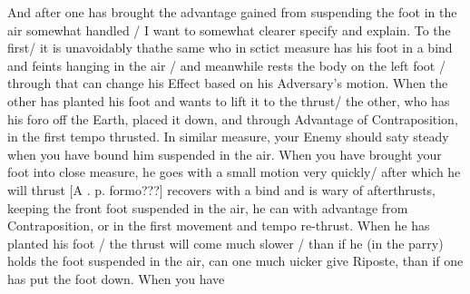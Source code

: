 And after one has brought the advantage gained from suspending the
foot in the air somewhat handled / I want to somewhat clearer specify
and explain. To the first/ it is unavoidably thathe same who in sctict
measure has his foot in a bind and feints hanging in the air / and
meanwhile rests the body on the left foot / through that can change
his Effect based on his Adversary's motion.
When the other has planted his foot and wants to lift it to the
thrust/ the other, who has his foro off the Earth, placed it down, and
through Advantage of Contraposition, in the first tempo thrusted. In
similar measure, your Enemy should saty steady when you have bound him
suspended in the air.
When you have brought your foot into close measure, he goes with a
small motion very quickly/ after which he will thrust [A
. p. formo???] recovers with a bind and is wary of afterthrusts,
keeping the front foot suspended in the air, he can with advantage
from Contraposition, or in the first movement and tempo re-thrust.
When he has planted his foot / the thrust will come much slower / than
if he (in the parry) holds the foot suspended in the air, can one much
uicker give Riposte, than if one has put the foot down. When you have
